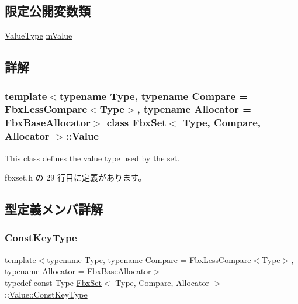 \subsection*{限定公開変数類}
\begin{DoxyCompactItemize}
\item 
\hyperlink{class_fbx_set_1_1_value_aa4757d6676c438c18ab271c57997d8eb}{Value\+Type} \hyperlink{class_fbx_set_1_1_value_ae8a99bc167579b0edf8e131f4a7731a9}{m\+Value}
\end{DoxyCompactItemize}


\subsection{詳解}
\subsubsection*{template$<$typename Type, typename Compare = Fbx\+Less\+Compare$<$\+Type$>$, typename Allocator = Fbx\+Base\+Allocator$>$\newline
class Fbx\+Set$<$ Type, Compare, Allocator $>$\+::\+Value}

This class defines the value type used by the set. 

 fbxset.\+h の 29 行目に定義があります。



\subsection{型定義メンバ詳解}
\mbox{\label{class_fbx_set_1_1_value_a184e74f6d42151d97b2c1381b5f642e7}} 
\subsubsection{\texorpdfstring{Const\+Key\+Type}{ConstKeyType}}
{\footnotesize\ttfamily template$<$typename Type, typename Compare = Fbx\+Less\+Compare$<$\+Type$>$, typename Allocator = Fbx\+Base\+Allocator$>$ \\
typedef const Type \hyperlink{class_fbx_set}{Fbx\+Set}$<$ Type, Compare, Allocator $>$\+::\hyperlink{class_fbx_set_1_1_value_a184e74f6d42151d97b2c1381b5f642e7}{Value\+::\+Const\+Key\+Type}}



